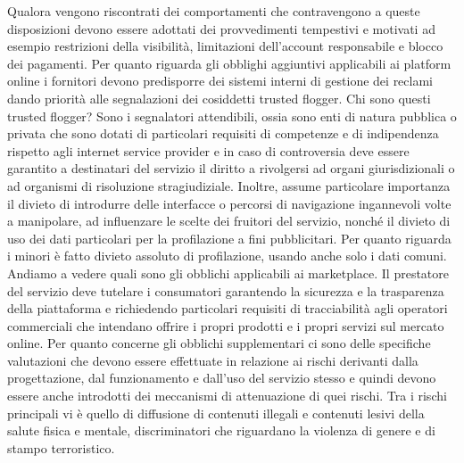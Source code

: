 Qualora vengono riscontrati dei comportamenti che contravengono a queste disposizioni devono essere adottati dei provvedimenti tempestivi e motivati ad esempio restrizioni della visibilità, limitazioni dell'account responsabile e blocco dei pagamenti.
Per quanto riguarda gli obblighi aggiuntivi applicabili ai platform online i fornitori devono predisporre dei sistemi interni di gestione dei reclami dando priorità alle segnalazioni dei cosiddetti trusted flogger.
Chi sono questi trusted flogger?
Sono i segnalatori attendibili, ossia sono enti di natura pubblica o privata che sono dotati di particolari requisiti di competenze e di indipendenza rispetto agli internet service provider e in caso di controversia deve essere garantito a destinatari del servizio il diritto a rivolgersi ad organi giurisdizionali o ad organismi di risoluzione stragiudiziale.
Inoltre, assume particolare importanza il divieto di introdurre delle interfacce o percorsi di navigazione ingannevoli volte a manipolare, ad influenzare le scelte dei fruitori del servizio, nonché il divieto di uso dei dati particolari per la profilazione a fini pubblicitari.
Per quanto riguarda i minori è fatto divieto assoluto di profilazione, usando anche solo i dati comuni.
Andiamo a vedere quali sono gli obblichi applicabili ai marketplace.
Il prestatore del servizio deve tutelare i consumatori garantendo la sicurezza e la trasparenza della piattaforma e richiedendo particolari requisiti di tracciabilità agli operatori commerciali che intendano offrire i propri prodotti e i propri servizi sul mercato online.
Per quanto concerne gli obblichi supplementari ci sono delle specifiche valutazioni che devono essere effettuate in relazione ai rischi derivanti dalla progettazione, dal funzionamento e dall'uso del servizio stesso e quindi devono essere anche introdotti dei meccanismi di attenuazione di quei rischi.
Tra i rischi principali vi è quello di diffusione di contenuti illegali e contenuti lesivi della salute fisica e mentale, discriminatori che riguardano la violenza di genere e di stampo terroristico.

